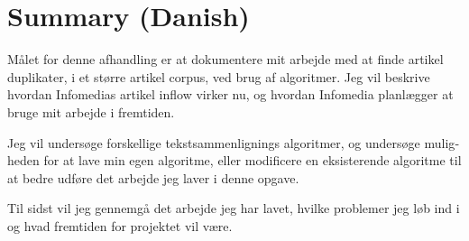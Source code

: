 \chapter{Summary (Danish)}
\begin{otherlanguage}{danish}

Målet for denne afhandling er at dokumentere mit arbejde med at finde artikel duplikater, i et større artikel corpus, ved brug af algoritmer. Jeg vil beskrive hvordan Infomedias artikel inflow virker nu, og hvordan Infomedia planlægger at bruge mit arbejde i fremtiden.

Jeg vil undersøge forskellige tekstsammenlignings algoritmer, og undersøge muligheden for at lave min egen algoritme, eller modificere en eksisterende algoritme til at bedre udføre det arbejde jeg laver i denne opgave.

Til sidst vil jeg gennemgå det arbejde jeg har lavet, hvilke problemer jeg løb ind i og hvad fremtiden for projektet vil være.

\end{otherlanguage}